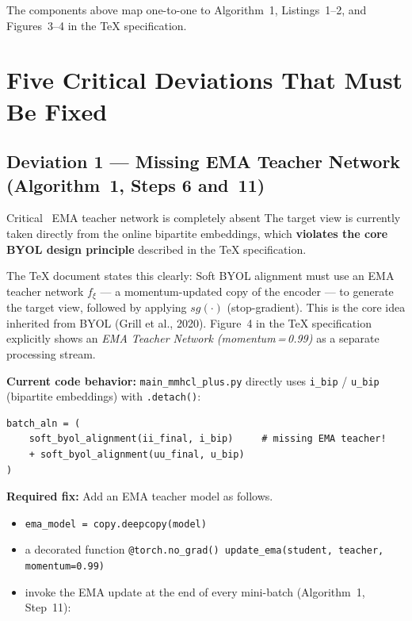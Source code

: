 \documentclass[11pt,a4paper]{article}
\begin{document}
\noindent The components above map one-to-one to Algorithm~1, Listings~1--2, and Figures~3--4 in the \TeX{} specification.

\section{Five Critical Deviations That Must Be Fixed}

\subsection{Deviation 1 --- Missing EMA Teacher Network (Algorithm~1, Steps 6 and~11)}

\begin{alertbox}{Critical \textemdash\ EMA teacher network is completely absent}
The target view is currently taken directly from the online bipartite embeddings,
which \textbf{violates the core BYOL design principle} described in the \TeX{} specification.
\end{alertbox}

The \TeX{} document states this clearly: Soft BYOL alignment must use an EMA teacher network $f_{\xi}$ --- a momentum-updated copy of the encoder --- to generate the target view, followed by applying $sg(\cdot)$ (stop-gradient).
This is the core idea inherited from BYOL (Grill et al., 2020).
Figure~4 in the \TeX{} specification explicitly shows an \emph{EMA Teacher Network (momentum\,=\,0.99)} as a separate processing stream.

\textbf{Current code behavior:} \texttt{main\_mmhcl\_plus.py} directly uses \texttt{i\_bip} / \texttt{u\_bip} (bipartite embeddings) with \texttt{.detach()}:

\begin{lstlisting}[style=mypython, caption={Current (incorrect) alignment call}]
batch_aln = (
    soft_byol_alignment(ii_final, i_bip)     # missing EMA teacher!
    + soft_byol_alignment(uu_final, u_bip)
)
\end{lstlisting}

\textbf{Required fix:} Add an EMA teacher model as follows.
\begin{itemize}[leftmargin=1.5em, itemsep=2pt]
\item \texttt{ema\_model = copy.deepcopy(model)}
\item a decorated function \texttt{@torch.no\_grad() update\_ema(student, teacher, momentum=0.99)}
\item invoke the EMA update at the end of every mini-batch (Algorithm~1, Step~11):
\end{itemize}
\end{document}
